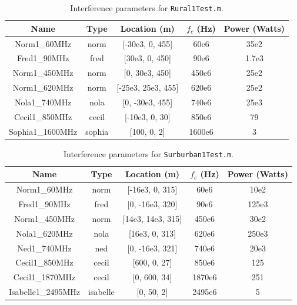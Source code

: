 %
\renewcommand\arraystretch{2.0}
\begin{table}[htp]
\begin{center}
\caption{Interference parameters for {\tt Rural1Test.m}.}
\begin{tabular}{|c|c|c|c|c|}
\hline
    Name        & Type           & Location (m)         & $f_c$ (Hz)  & Power (Watts)\\
\hline \hline
 Norm1\_60MHz&     norm&     [-30e3, 0,      455]&   60e6&       35e2\\
\hline
 Fred1\_90MHz&     fred&     [30e3,  0,      450]&   90e6&       1.7e3\\
\hline
 Norm1\_450MHz&    norm&     [0,     30e3,   450]&   450e6&      25e2\\
\hline
 Norm1\_620MHz&    norm&     [-25e3, 25e3,   455]&   620e6&      25e2\\
\hline
 Nola1\_740MHz&    nola&     [0,     -30e3,  455]&   740e6&      25e3\\
\hline
 Cecil1\_850MHz&   cecil&    [-10e3, 0,      30]&    850e6&      79\\
\hline
 Sophia1\_1600MHz& sophia&   [100,   0,      2]&     1600e6&     3\\
\hline
\end{tabular}
\label{tab:rural1test}
\end{center}
\end{table}
%
%
\renewcommand\arraystretch{2.0}
\begin{table}[htp]
\begin{center}
\caption{Interference parameters for {\tt Surburban1Test.m}.}
\begin{tabular}{|c|c|c|c|c|}
\hline
    Name        & Type           & Location (m)         & $f_c$ (Hz)  & Power (Watts)\\
\hline \hline
    Norm1\_60MHz & norm&     [-16e3, 0, 315]& 60e6&       10e2 \\
\hline
    Fred1\_90MHz&     fred&     [0,     -16e3,  320]&   90e6& 125e3\\
\hline
    Norm1\_450MHz&    norm&     [14e3,  14e3,   315]&   450e6& 30e2\\
\hline
    Nola1\_620MHz&    nola&     [16e3,  0,      313]&   620e6&250e3\\
\hline
    Ned1\_740MHz&     ned&      [0,     -16e3,  321]&   740e6&20e3\\
\hline
    Cecil1\_850MHz&   cecil&    [600,   0,      27]&    850e6&125\\
\hline
    Cecil1\_1870MHz&  cecil&    [0,     600,    34]&    1870e6& 251\\
\hline
    Isabelle1\_2495MHz&isabelle&[0,     50,     2]&     2495e6& 5\\
\hline
\end{tabular}
\label{tab:surburban1test}
\end{center}
\end{table}
